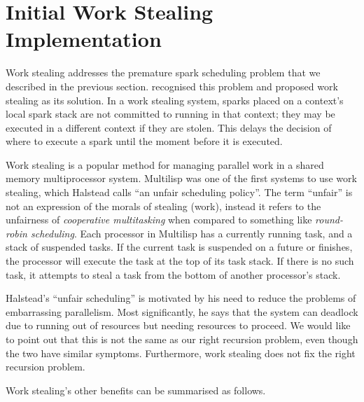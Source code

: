 
\section{Initial Work Stealing Implementation}
\label{sec:rts_work_stealing}


Work stealing addresses the premature spark scheduling problem that we
described in the previous section.
\citet{wang:2006:hons} recognised this problem and proposed work stealing as
its solution.
In a work stealing system,
sparks placed on a context's local spark stack
are not committed to running in that context;
they may be executed in a different context if they are stolen.
This delays the decision of where to execute a spark until the moment
before it is executed.

Work stealing is a popular method for managing parallel work in a shared
memory multiprocessor system.
Multilisp \citep{halstead:1985:multilisp} was one of the first systems to
use work stealing,
which Halstead calls ``an unfair scheduling policy''.
The term ``unfair'' is not an expression of the morals of stealing (work),
instead it refers to the unfairness of \emph{cooperative multitasking} when
compared to something like \emph{round-robin scheduling}.
Each processor in Multilisp has a currently running task,
and a stack of suspended tasks.
If the current task is suspended on a future or finishes,
the processor will execute the task at the top of its task stack.
If there is no such task,
it attempts to steal a task from the bottom of another processor's stack.

Halstead's ``unfair scheduling'' is motivated by his need to reduce the
problems of embarrassing parallelism.
Most significantly,
he says that the system can deadlock due to running out of resources but
needing resources to proceed.
We would like to point out that
this is not the same as our right recursion problem,
even though the two have similar symptoms.
Furthermore,
work stealing does not fix the right recursion problem.

Work stealing's other benefits can be summarised as follows.

